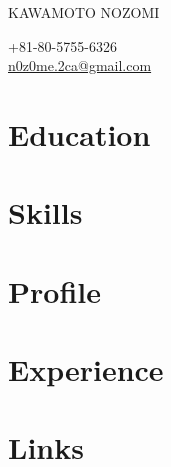 \documentclass[10pt]{article} %
\begin{document}

\parbox[top][0.12\textheight][c]{\linewidth}{ %
	\vspace{-0.04\textheight} %
	{\color{name}\Huge KAWAMOTO NOZOMI}\\\medskip %
}

\begin{paracol}{2} %

{\faPhone} +81-80-5755-6326 \\ %
{\small\faEnvelope} \href{mailto:n0z0me.2ca@gmail.com}{n0z0me.2ca@gmail.com} \\ %

\section{\Large Education}

\section{\Large Skills}

\switchcolumn %

\section{Profile}

\section{Experience}

\section{Links}


\end{paracol}

\end{document}
